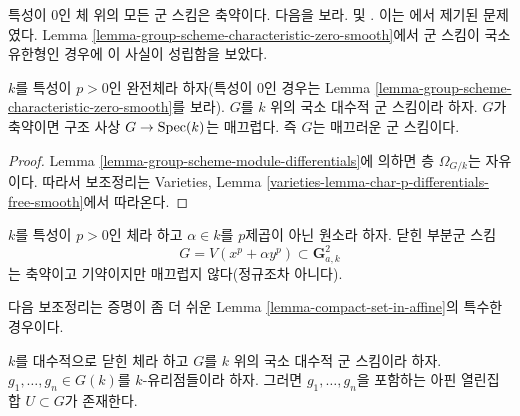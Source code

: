 \begin{remark}
\label{remark-when-reduced}
특성이 $0$인 체 위의 모든 군 스킴은 축약이다. 다음을 보라.
\cite[I, Theorem 1.1 and I, Corollary 3.9, and II, Theorem 2.4]{Perrin-thesis}
및
\cite[Proposition 4.2.8]{Perrin}.
이는 \cite[page 80]{Oort}에서 제기된 문제였다.
Lemma \ref{lemma-group-scheme-characteristic-zero-smooth}에서 군 스킴이 국소 유한형인 경우에 이 사실이 성립함을 보았다.
\end{remark}

\begin{lemma}
\label{lemma-reduced-group-scheme-prefect-field-characteristic-p-smooth}
$k$를 특성이 $p > 0$인 완전체라 하자(특성이 0인 경우는
Lemma \ref{lemma-group-scheme-characteristic-zero-smooth}를 보라).
$G$를 $k$ 위의 국소 대수적 군 스킴이라 하자. $G$가 축약이면 구조 사상
$G \to \mathop{\mathrm{Spec}}(k)$는 매끄럽다. 즉 $G$는 매끄러운 군 스킴이다.
\end{lemma}

\begin{proof}
Lemma \ref{lemma-group-scheme-module-differentials}에 의하면 층 $\Omega_{G/k}$는 자유이다. 따라서 보조정리는
Varieties, Lemma \ref{varieties-lemma-char-p-differentials-free-smooth}에서 따라온다.
\end{proof}

\begin{remark}
\label{remark-reduced-smooth-not-true-general}
$k$를 특성이 $p > 0$인 체라 하고 $\alpha \in k$를 $p$제곱이 아닌 원소라 하자.
닫힌 부분군 스킴
$$
G = V(x^p + \alpha y^p) \subset \mathbf{G}_{a, k}^2
$$
는 축약이고 기약이지만 매끄럽지 않다(정규조차 아니다).
\end{remark}

\noindent
다음 보조정리는 증명이 좀 더 쉬운 Lemma \ref{lemma-compact-set-in-affine}의 특수한 경우이다.

\begin{lemma}
\label{lemma-points-in-affine}
$k$를 대수적으로 닫힌 체라 하고 $G$를 $k$ 위의 국소 대수적 군 스킴이라 하자.
$g_1, \ldots, g_n \in G(k)$를 $k$-유리점들이라 하자. 그러면 $g_1, \ldots, g_n$을 포함하는
아핀 열린집합 $U \subset G$가 존재한다.
\end{lemma}

